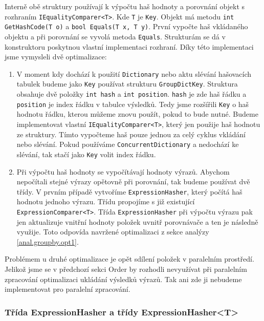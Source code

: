 Interně obě struktury používají k výpočtu haš hodnoty a porovnání objekt s rozhraním \texttt{IEqualityComparer<T>}.
Kde \texttt{T} je \texttt{Key}. 
Objekt má metodu \texttt{int GetHashCode(T o)} a \texttt{bool Equals(T x, T y)}.
První vypočte haš vkládaného objektu a při porovnání se vyvolá metoda \texttt{Equals}.
Strukturám se dá v konstruktoru poskytnou vlastní implementaci rozhraní.
Díky této implementaci jsme vymysleli dvě optimalizace:
\begin{enumerate}
\item V moment kdy dochází k použití \texttt{Dictionary} nebo aktu slévání hašovacích tabulek budeme jako \texttt{Key} používat strukturu \texttt{GroupDictKey}.
Struktura obsahuje dvě položky \texttt{int hash} a \texttt{int position}. 
\texttt{hash} je zde haš řádku a \texttt{position} je index řádku v tabulce výsledků.
Tedy jsme rozšířili \texttt{Key} o haš hodnotu řádku, kterou můžeme znovu použít, pokud to bude nutné.
Budeme implementovat vlastní \texttt{IEqualityComparer<T>}, který jen použije haš hodnotu ze struktury.
Tímto vypočteme haš pouze jednou za celý cyklus vkládání nebo slévání.
Pokud používáme \texttt{ConcurrentDictionary} a nedochází ke slévání, tak stačí jako \texttt{Key} volit index řádku.
\item Při výpočtu haš hodnoty se vypočítávají hodnoty výrazů.
Abychom nepočítali stejné výrazy opětovně při porovnání, tak budeme používat dvě třídy.
V prvním případě vytvoříme \texttt{ExpressionHasher}, který počítá haš hodnotu jednoho výrazu.
Třídu propojíme s již existující \texttt{ExpressionComparer<T>}.
Třída \texttt{ExpressionHasher} při výpočtu výrazu pak jen aktualizuje vnitřní hodnoty položek uvnitř porovnávače a ten je následně využije.
Toto odpovída navržené optimalizaci z sekce analýzy \ref{anal.groupby.opt1}.
\end{enumerate}
Problémem u druhé optimalizace je opět sdílení položek v paralelním prostředí.
Jelikož jsme se v předchozí sekci Order by rozhodli nevyužívat při paralelním zpracování optimalizaci ukládání výsledků výrazů.
Tak ani zde ji nebudeme implementovat pro paralelní zpracování. 

\subsubsection{Třída ExpressionHasher a třídy ExpressionHasher<T>}

